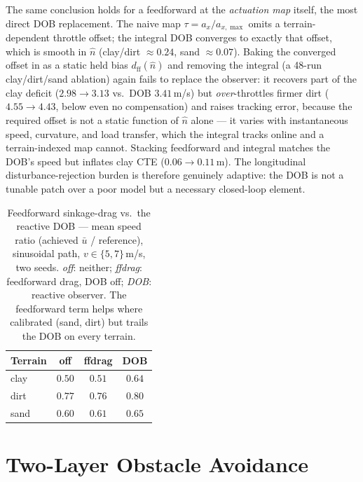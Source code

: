 \documentclass[conference,letterpaper,10pt]{IEEEtran}
\begin{document}
The same conclusion holds for a feedforward at the \emph{actuation map}
itself, the most direct DOB replacement. The naive map
$\tau=a_x/a_{x,\max}$ omits a terrain-dependent throttle offset; the
integral DOB converges to exactly that offset, which is smooth in $\hat
n$ (clay/dirt ${\approx}0.24$, sand ${\approx}0.07$). Baking the
converged offset in as a static held bias $d_\mathrm{ff}(\hat n)$ and
removing the integral (a 48-run clay/dirt/sand ablation) again fails to
replace the observer: it recovers part of the clay deficit
($2.98\!\to\!3.13$ vs.\ DOB $3.41\,$m/s) but \emph{over}-throttles
firmer dirt ($4.55\!\to\!4.43$, below even no compensation) and raises
tracking error, because the required offset is not a static function of
$\hat n$ alone --- it varies with instantaneous speed, curvature, and
load transfer, which the integral tracks online and a terrain-indexed
map cannot. Stacking feedforward and integral matches the DOB's speed
but inflates clay CTE ($0.06\!\to\!0.11\,$m). The longitudinal
disturbance-rejection burden is therefore genuinely adaptive: the DOB is
not a tunable patch over a poor model but a necessary closed-loop
element.

\begin{table}[!t]
  \renewcommand{\arraystretch}{1.15}
  \caption{Feedforward sinkage-drag vs.\ the reactive DOB --- mean speed
    ratio (achieved $\bar u$ / reference), sinusoidal path,
    $v\!\in\!\{5,7\}\,$m/s, two seeds. \emph{off}: neither;
    \emph{ffdrag}: feedforward drag, DOB off; \emph{DOB}: reactive
    observer. The feedforward term helps where calibrated (sand, dirt)
    but trails the DOB on every terrain.}
  \label{tab:ffdrag}
  \centering
  \setlength{\tabcolsep}{6pt}
  \begin{tabular}{lccc}
    \toprule
    \textbf{Terrain} & \textbf{off} & \textbf{ffdrag} & \textbf{DOB}\\
    \midrule
    clay & $0.50$ & $0.51$ & $\mathbf{0.64}$\\
    dirt & $0.77$ & $0.76$ & $\mathbf{0.80}$\\
    sand & $0.60$ & $0.61$ & $\mathbf{0.65}$\\
    \bottomrule
  \end{tabular}
\end{table}

\section{Two-Layer Obstacle Avoidance}
\label{sec:safety}
\end{document}
